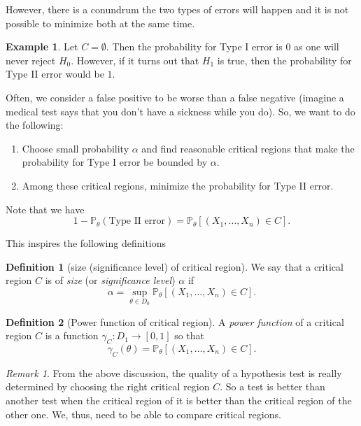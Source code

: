 \documentclass[
  openany]{book}
\theoremstyle{definition}
\newtheorem{definition}{Definition}[chapter]
\theoremstyle{definition}
\newtheorem{example}{Example}[chapter]
\theoremstyle{definition}
\theoremstyle{definition}
\theoremstyle{remark}
\newtheorem*{remark}{Remark}
\begin{document}
However, there is a conundrum the two types of errors will happen and it is
not possible to minimize both at the same time.

\begin{example}
Let \(C = \emptyset\). Then the probability for Type I error is \(0\) as one will never
reject \(H_0\).
However, if it turns out that \(H_1\) is true, then the probability for Type II error
would be \(1\).
\end{example}

Often, we consider a false positive to be worse than a false negative (imagine
a medical test says that you don't have a sickness while you do).
So, we want to do the following:

\begin{enumerate}
\def\labelenumi{\arabic{enumi}.}
\item
  Choose small probability \(\alpha\) and find reasonable
  critical regions that make the probability for Type I error be bounded by \(\alpha\).
\item
  Among these critical regions, minimize the probability for Type II error.
\end{enumerate}

Note that we have
\[ 1 - \mathbb{P}_\theta ( \text{Type II error}) = \mathbb{P}_\theta \left[ (X_1, \dots, X_n) \in C  \right].\]

This inspires the following definitions

\begin{definition}[size (significance level) of critical region]
We say that a critical region \(C\) is of \emph{size} (or \emph{significance level}) \(\alpha\) if
\[ \alpha = \sup_{\theta \in D_0} \mathbb{P}_\theta \left[ (X_1, \dots, X_n) \in C  \right].\]
\end{definition}

\begin{definition}[Power function of critical region]
A \emph{power function} of a critical region \(C\) is a function \(\gamma_C: D_1 \to [0,1]\)
so that
\[ \gamma_C(\theta) = \mathbb{P}_\theta \left[ (X_1, \dots, X_n) \in C  \right].\]
\end{definition}

\begin{remark}
From the above discussion, the quality of a hypothesis test is really determined by
choosing the right critical region \(C\). So a test is better than another test
when the critical region of it is better than the critical region of the other one.
We, thus, need to be able to compare critical regions.
\end{remark}
\end{document}
